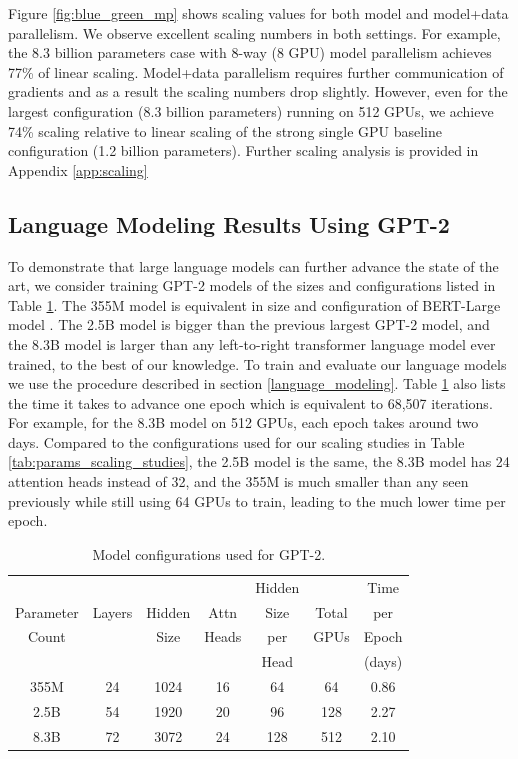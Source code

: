 \documentclass{article}
\begin{document}
Figure \ref{fig:blue_green_mp} shows scaling values for both model and model+data parallelism. We observe excellent scaling numbers in both settings. For example, the 8.3 billion parameters case with 8-way (8 GPU) model parallelism achieves 77\% of linear scaling. Model+data parallelism requires further communication of gradients and as a result the scaling numbers drop slightly. However, even for the largest configuration (8.3 billion parameters) running on 512 GPUs, we achieve 74\% scaling relative to linear scaling of the strong single GPU baseline configuration (1.2 billion parameters). Further scaling analysis is provided in Appendix \ref{app:scaling}

\subsection{Language Modeling Results Using GPT-2}
To demonstrate that large language models can further advance the state of the art, we consider training GPT-2 models of the sizes and configurations listed in Table \ref{tab:model_size}. The 355M model is equivalent in size and configuration of BERT-Large model \cite{devlin2018bert}. The 2.5B model is bigger than the previous largest GPT-2 model, and the 8.3B model is larger than any left-to-right transformer language model ever trained, to the best of our knowledge. To train and evaluate our language models we use the procedure described in section \ref{language_modeling}. Table \ref{tab:model_size} also lists the time it takes to advance one epoch which is equivalent to 68,507 iterations. For example, for the 8.3B model on 512 GPUs, each epoch takes around two days. Compared to the configurations used for our scaling studies in Table \ref{tab:params_scaling_studies}, the 2.5B model is the same, the 8.3B model has 24 attention heads instead of 32, and the 355M is much smaller than any seen previously while still using 64 GPUs to train, leading to the much lower time per epoch.

\begin{table}
\footnotesize
\begin{center}
\caption{Model configurations used for GPT-2.}
\label{tab:model_size}
\begin{tabular}{c@{\hskip3pt}|@{\hskip3pt}c@{\hskip3pt}|@{\hskip3pt}c@{\hskip3pt}|@{\hskip3pt}c@{\hskip3pt}|@{\hskip3pt}c@{\hskip3pt}|@{\hskip3pt}c@{\hskip3pt}|@{\hskip3pt}c} \hline \hline
 &  &  &  & Hidden &  & Time \\
Parameter & Layers & Hidden & Attn & Size & Total & per \\
Count &  & Size & Heads & per & GPUs & Epoch \\
 &  &  &  & Head &  & (days) \\ \hline
355M & 24 &  1024 &	16 & 64  &  64  & 0.86  \\ 
2.5B &  54 & 1920 & 20 & 96  &  128 & 2.27  \\ 
8.3B & 72 & 3072 &  24 &  128 & 512 & 2.10   \\ \hline 
\end{tabular}
\end{center}
\end{table}
\end{document}
